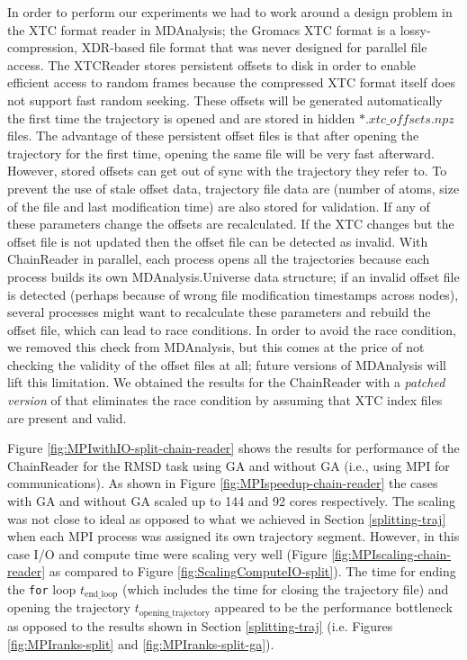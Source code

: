 In order to perform our experiments we had to work around a design problem in the XTC format reader in MDAnalysis; the Gromacs XTC format \citep{Lindahl01} is a lossy-compression, XDR-based file format that was never designed for parallel file access.
The XTCReader stores persistent offsets to disk \citep{Gowers:2016aa} in order to enable efficient access to random frames because the compressed XTC format itself does not support fast random seeking.
These offsets will be generated automatically the first time the trajectory is opened and are stored in hidden $\ast.xtc\_offsets.npz$ files. 
The advantage of these persistent offset files is that after opening the trajectory for the first time, opening the same file will be very fast afterward. 
However, stored offsets can get out of sync with the trajectory they refer to. 
To prevent the use of stale offset data, trajectory file data are (number of atoms, size of the file and last modification time) are also stored for validation.
If any of these parameters change the offsets are recalculated. 
If the XTC changes but the offset file is not updated then the offset file can be detected as invalid.
With ChainReader in parallel, each process opens all the trajectories because each process builds its own MDAnalysis.Universe data structure; if an invalid offset file is detected (perhaps because of wrong file modification timestamps across nodes), several processes might want to recalculate these parameters and rebuild the offset file, which can lead to race conditions.
In order to avoid the race condition, we removed this check from MDAnalysis, but this comes at the price of not checking the validity of the offset files at all; future versions of MDAnalysis will lift this limitation.  
We obtained the results for the ChainReader with a \emph{patched version} of  that eliminates the race condition by assuming that XTC index files are present and valid.

Figure \ref{fig:MPIwithIO-split-chain-reader} shows the results for performance of the ChainReader for the RMSD task using GA and without GA (i.e., using MPI for communications). 
As shown in Figure \ref{fig:MPIspeedup-chain-reader} the cases with GA and without GA scaled up to 144 and 92 cores respectively.
The scaling was not close to ideal as opposed to what we achieved in Section \ref{splitting-traj} when each MPI process was assigned its own trajectory segment. 
However, in this case I/O and compute time were scaling very well (Figure \ref{fig:MPIscaling-chain-reader} as compared to Figure \ref{fig:ScalingComputeIO-split}).
The time for ending the \texttt{for} loop $t_{\text{end\_loop}}$ (which includes the time for closing the trajectory file) and opening the trajectory $t_{\text{opening\_trajectory}}$ appeared to be the performance bottleneck as opposed to the results shown in Section \ref{splitting-traj} (i.e. Figures \ref{fig:MPIranks-split} and \ref{fig:MPIranks-split-ga}). 

